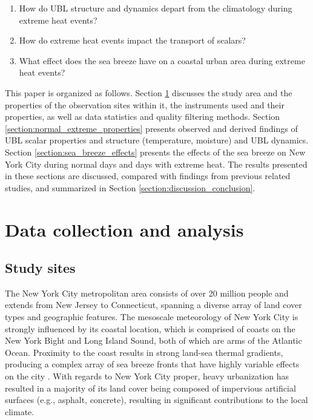 \begin{enumerate}
  \item How do UBL structure and dynamics depart from the climatology during extreme heat events?
  \item How do extreme heat events impact the transport of scalars?
  \item What effect does the sea breeze have on a coastal urban area during extreme heat events?
\end{enumerate}

This paper is organized as follows. Section \ref{section:data_methods} discusses the study area and the properties of the observation sites within it, the instruments used and their properties, as well as data statistics and quality filtering methods. Section \ref{section:normal_extreme_properties} presents observed and derived findings of UBL scalar properties and structure (temperature, moisture) and UBL dynamics. Section \ref{section:sea_breeze_effects} presents the effects of the sea breeze on New York City during normal days and days with extreme heat. The results presented in these sections are discussed, compared with findings from previous related studies, and summarized in Section \ref{section:discussion_conclusion}.


\section{Data collection and analysis} \label{section:data_methods}

\subsection{Study sites} 

The New York City metropolitan area consists of over 20 million people \citep{bureau2021} and extends from New Jersey to Connecticut, spanning a diverse array of land cover types and geographic features. The mesoscale meteorology of New York City is strongly influenced by its coastal location, which is comprised of coasts on the New York Bight and Long Island Sound, both of which are arms of the Atlantic Ocean. Proximity to the coast results in strong land-sea thermal gradients, producing a complex array of sea breeze fronts that have highly variable effects on the city \citep{bornstein1981, gedzelman2003}. With regards to New York City proper, heavy urbanization has resulted in a majority of its land cover being composed of impervious artificial surfaces (e.g., asphalt, concrete), resulting in significant contributions to the local climate.

